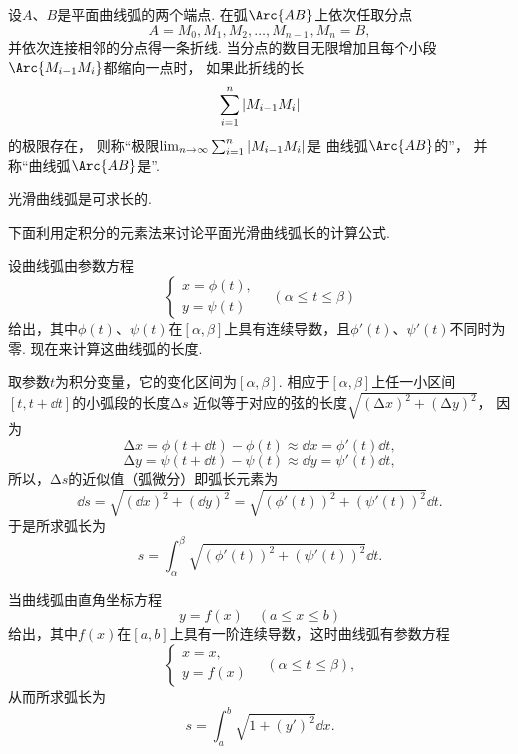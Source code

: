 设\(A\)、\(B\)是平面曲线弧的两个端点.
在弧\(\Arc{AB}\)上依次任取分点\[
	A=M_0,M_1,M_2,\dotsc,M_{n-1},M_n=B,
\]并依次连接相邻的分点得一条折线.
当分点的数目无限增加且每个小段\(\Arc{M_{i-1}M_i}\)都缩向一点时，
如果此折线的长\[
	\sum_{i=1}^n \abs{M_{i-1} M_i}
\]的极限存在，
则称“极限\(\lim_{n\to\infty} \sum_{i=1}^n \abs{M_{i-1} M_i}\)是
曲线弧\(\Arc{AB}\)的”，
并称“曲线弧\(\Arc{AB}\)是”.

\begin{theorem}
光滑曲线弧是可求长的.
\end{theorem}

下面利用定积分的元素法来讨论平面光滑曲线弧长的计算公式.

设曲线弧由参数方程\[
\left\{ \begin{array}{l}
x = \phi(t), \\
y = \psi(t)
\end{array} \right.
\quad(\alpha \leq t \leq \beta)
\]给出，其中\(\phi(t)\)、\(\psi(t)\)在\([\alpha,\beta]\)上具有连续导数，且\(\phi'(t)\)、\(\psi'(t)\)不同时为零.
现在来计算这曲线弧的长度.

取参数\(t\)为积分变量，它的变化区间为\([\alpha,\beta]\).
相应于\([\alpha,\beta]\)上任一小区间\([t,t+\dd{t}]\)的小弧段的长度\(\increment s\)
近似等于对应的弦的长度\(\sqrt{(\increment x)^2+(\increment y)^2}\)，
因为\[
	\increment x
	= \phi(t+\dd{t})-\phi(t)
	\approx \dd{x}
	= \phi'(t) \dd{t},
\]\[
	\increment y
	= \psi(t+\dd{t})-\psi(t)
	\approx \dd{y}
	= \psi'(t) \dd{t},
\]
所以，\(\increment s\)的近似值（弧微分）即弧长元素为\[
	\dd{s} = \sqrt{(\dd{x})^2 + (\dd{y})^2}
	= \sqrt{(\phi'(t))^2 + (\psi'(t))^2} \dd{t}.
\]
于是所求弧长为\begin{equation}
	s = \int_\alpha^\beta \sqrt{(\phi'(t))^2 + (\psi'(t))^2} \dd{t}.
\end{equation}

当曲线弧由直角坐标方程\[
y = f(x) \quad(a \leq x \leq b)
\]给出，其中\(f(x)\)在\([a,b]\)上具有一阶连续导数，这时曲线弧有参数方程\[
	\left\{ \begin{array}{l}
		x = x, \\
		y = f(x)
	\end{array} \right.
	\quad(\alpha \leq t \leq \beta),
\]
从而所求弧长为\begin{equation}
	s = \int_a^b \sqrt{1+(y')^2} \dd{x}.
\end{equation}

